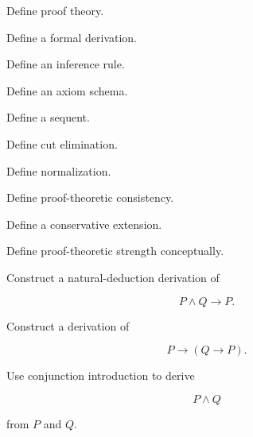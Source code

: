 \begin{exercise}[1]
Define proof theory.
\end{exercise}

\begin{exercise}[1]
Define a formal derivation.
\end{exercise}

\begin{exercise}[1]
Define an inference rule.
\end{exercise}

\begin{exercise}[1]
Define an axiom schema.
\end{exercise}

\begin{exercise}[1]
Define a sequent.
\end{exercise}

\begin{exercise}[1]
Define cut elimination.
\end{exercise}

\begin{exercise}[1]
Define normalization.
\end{exercise}

\begin{exercise}[1]
Define proof-theoretic consistency.
\end{exercise}

\begin{exercise}[1]
Define a conservative extension.
\end{exercise}

\begin{exercise}[1]
Define proof-theoretic strength conceptually.
\end{exercise}

\begin{exercise}[2]
Construct a natural-deduction derivation of

\[
P\land Q\rightarrow P.
\]
\end{exercise}

\begin{exercise}[2]
Construct a derivation of

\[
P\rightarrow(Q\rightarrow P).
\]
\end{exercise}

\begin{exercise}[2]
Use conjunction introduction to derive

\[
P\land Q
\]

from \(P\) and \(Q\).
\end{exercise}

